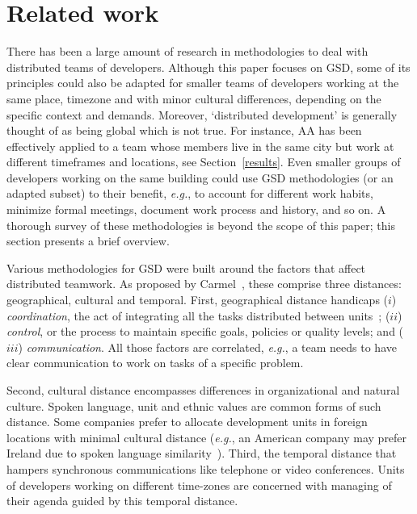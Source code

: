\documentclass{article}
\newcommand{\eg}{{\it e.g.}}
\newcommand{\indraftnote}[1]{}
\newcommand{\todo}[1]{\indraftnote{todo: #1}}
\begin{document}
\indraftnote{TODO: cite CIA.vc bot stuff}

\section{Related work}
\label{related-work}
\nocite{gobbo:APSEEP2008}
\nocite{Reis:PhDThesis:2003}



There has been a large amount of research in methodologies to deal with
distributed teams of developers. Although this paper focuses on GSD, some of
its principles could also be adapted for smaller teams of developers working at
the same place, timezone and with minor cultural differences, depending on the
specific context and demands.  Moreover, `distributed development' is generally
thought of as being global which is not true. For instance, AA has been
effectively applied to a team whose members live in the same city but work at
different timeframes and locations, see Section~\ref{results}.  Even smaller
groups of developers working on the same building could use GSD methodologies
(or an adapted subset) to their benefit, \eg, to account for different work
habits, minimize formal meetings, document work process and history, and so on.
A thorough survey of these methodologies is beyond the scope of this paper; this
section presents a brief overview. 

Various methodologies for GSD were built around the factors that
affect distributed teamwork. As proposed by Carmel~\cite{carmel1999}, these
comprise three distances: geographical, cultural and temporal. 
First, geographical distance handicaps ($i$) \emph{coordination}, the act of
integrating all the tasks distributed between units~\cite{carmel2001}; ($ii$)
\emph{control}, or the process to maintain specific goals, policies or quality
levels; and ($iii$) \emph{communication}. All those factors are correlated, \eg,
a team needs to have clear communication to work on tasks of a specific problem.  

Second, cultural distance encompasses differences in organizational and
natural culture. Spoken language, unit and ethnic values are common
forms of such distance. Some companies prefer to allocate development
units in foreign locations with minimal cultural distance (\eg, an
American company may prefer Ireland due to spoken language
similarity~\cite{carmel2001}). Third, the temporal distance that
hampers synchronous communications like telephone or
video conferences. Units of developers working on different time-zones
are concerned with managing of their agenda guided by this temporal
distance.
\end{document}
